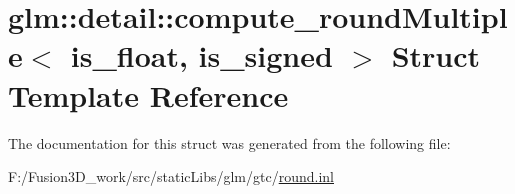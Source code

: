 \hypertarget{structglm_1_1detail_1_1compute__round_multiple}{}\section{glm\+:\+:detail\+:\+:compute\+\_\+round\+Multiple$<$ is\+\_\+float, is\+\_\+signed $>$ Struct Template Reference}
\label{structglm_1_1detail_1_1compute__round_multiple}


The documentation for this struct was generated from the following file\+:\begin{DoxyCompactItemize}
\item 
F\+:/\+Fusion3\+D\+\_\+work/src/static\+Libs/glm/gtc/\hyperlink{round_8inl}{round.\+inl}\end{DoxyCompactItemize}
